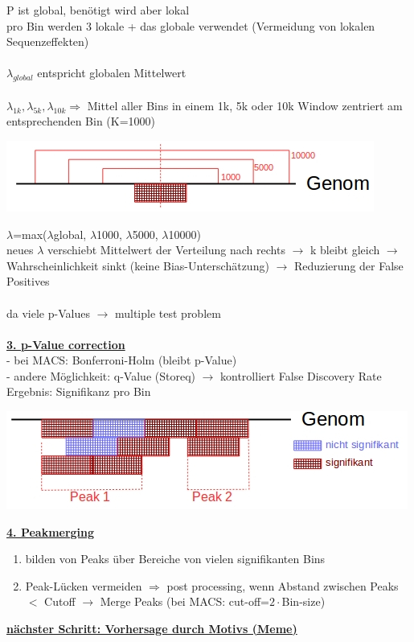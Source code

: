 P ist global, benötigt wird aber lokal\\
pro Bin werden 3 lokale + das globale verwendet (Vermeidung von lokalen Sequenzeffekten)
\\\\
$\lambda_{global}$ entspricht globalen Mittelwert
\\\\
$\lambda_{1k}, \lambda_{5k}, \lambda_{10k} \Rightarrow$ Mittel aller Bins in einem 1k, 5k oder 10k Window zentriert am entsprechenden Bin (K=1000)
\begin{center}
\includegraphics[scale=0.75]{lectures/160415/pix/lambdas.jpg}
\end{center}

$\lambda$=max($\lambda$global, $\lambda$1000, $\lambda$5000, $\lambda$10000)\\
neues $\lambda$ verschiebt Mittelwert der Verteilung nach rechts $\rightarrow$ k bleibt gleich $\rightarrow$ Wahrscheinlichkeit sinkt (keine Bias-Unterschätzung) $\rightarrow$ Reduzierung der False Positives
\\\\
da viele p-Values $\rightarrow$ multiple test problem
\\\\
\textbf{\underline{3. p-Value correction}}\\
 - bei MACS: Bonferroni-Holm (bleibt p-Value)\\
 - andere Möglichkeit: q-Value (Storeq) $\rightarrow$ kontrolliert False Discovery Rate\\
Ergebnis: Signifikanz pro Bin\\
\begin{center}
\includegraphics[scale=0.75]{lectures/160415/pix/sign2.jpg}
\end{center}
\textbf{\underline{4. Peakmerging}}\\
\begin{enumerate}
	\item bilden von Peaks über Bereiche von vielen signifikanten Bins
	\item Peak-Lücken vermeiden $\Rightarrow$ post processing, wenn Abstand zwischen Peaks $<$ Cutoff $\rightarrow$ Merge Peaks (bei MACS: cut-off=$ 2 \cdot $Bin-size)
\end{enumerate}
\textbf{
\underline{nächster Schritt: Vorhersage durch Motivs (Meme)}}\\

